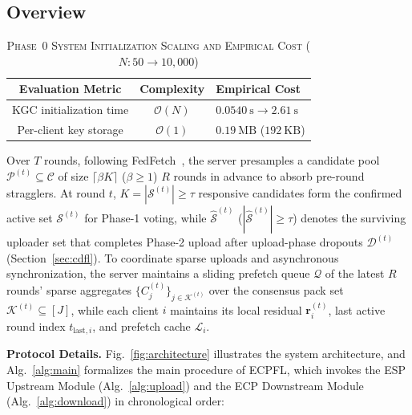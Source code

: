 \subsection{Overview}

\begin{table}[!t]
\centering
\caption{\textsc{Phase~0 System Initialization Scaling and Empirical Cost ($N: 50 \to 10{,}000$)}}
\label{tab:complexity}
\setlength{\tabcolsep}{4.5pt}
\renewcommand{\arraystretch}{1.35}
\begin{tabularx}{\columnwidth}{|c|c|>{\centering\arraybackslash}X|}
\hline
\textbf{Evaluation Metric} & \textbf{Complexity} & \textbf{Empirical Cost} \\
\hline
KGC initialization time & $\mathcal{O}(N)$ & $0.0540~\mathrm{s} \to 2.61~\mathrm{s}$ \\
\hline
Per-client key storage & $\mathcal{O}(1)$ & $0.19~\mathrm{MB}$ ($192~\mathrm{KB}$) \\
\hline
\end{tabularx}
\end{table}

Over $T$ rounds, following FedFetch~\cite{yan2025fedfetch}, the server presamples a candidate pool $\mathcal{P}^{(t)} \subseteq \mathcal{C}$ of size $\lceil \beta K \rceil$ ($\beta \ge 1$) $R$ rounds in advance to absorb pre-round stragglers. At round $t$, $K = |\mathcal{S}^{(t)}| \ge \tau$ responsive candidates form the confirmed active set $\mathcal{S}^{(t)}$ for Phase-1 voting, while $\widehat{\mathcal{S}}^{(t)}$ ($|\widehat{\mathcal{S}}^{(t)}| \ge \tau$) denotes the surviving uploader set that completes Phase-2 upload after upload-phase dropouts $\mathcal{D}^{(t)}$ (Section~\ref{sec:cdfl}). To coordinate sparse uploads and asynchronous synchronization, the server maintains a sliding prefetch queue $\mathcal{Q}$ of the latest $R$ rounds' sparse aggregates $\{C_j^{(t)}\}_{j \in \mathcal{K}^{(t)}}$ over the consensus pack set $\mathcal{K}^{(t)} \subseteq [J]$, while each client $i$ maintains its local residual $\mathbf{r}_i^{(t)}$, last active round index $t_{\mathrm{last},i}$, and prefetch cache $\mathcal{L}_i$.


\vspace{0.4em}\noindent\textbf{Protocol Details.} Fig.~\ref{fig:architecture} illustrates the system architecture, and Alg.~\ref{alg:main} formalizes the main procedure of \textsc{ECPFL}, which invokes the \textsc{ESP} Upstream Module (Alg.~\ref{alg:upload}) and the \textsc{ECP} Downstream Module (Alg.~\ref{alg:download}) in chronological order:

